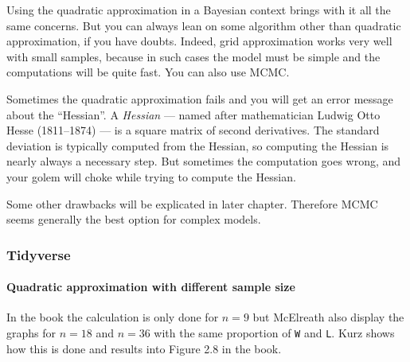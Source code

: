 \documentclass[
  letterpaper,
  DIV=11,
  numbers=noendperiod]{scrreprt}
\let\oldparagraph\paragraph
\renewcommand{\paragraph}[1]{\oldparagraph{#1}\mbox{}}
\begin{document}
Using the quadratic approximation in a Bayesian context brings with it
all the same concerns. But you can always lean on some algorithm other
than quadratic approximation, if you have doubts. Indeed, grid
approximation works very well with small samples, because in such cases
the model must be simple and the computations will be quite fast. You
can also use MCMC.

Sometimes the quadratic approximation fails and you will get an error
message about the ``Hessian''. A \emph{Hessian} --- named after
mathematician Ludwig Otto Hesse (1811--1874) --- is a square matrix of
second derivatives. The standard deviation is typically computed from
the Hessian, so computing the Hessian is nearly always a necessary step.
But sometimes the computation goes wrong, and your golem will choke
while trying to compute the Hessian.

Some other drawbacks will be explicated in later chapter. Therefore MCMC
seems generally the best option for complex models.

\hypertarget{tidyverse-7}{%
\subsubsection{Tidyverse}\label{tidyverse-7}}

\hypertarget{quadratic-approximation-with-different-sample-size}{%
\paragraph{Quadratic approximation with different sample
size}\label{quadratic-approximation-with-different-sample-size}}

In the book the calculation is only done for \(n = 9\) but McElreath
also display the graphs for \(n = 18\) and \(n = 36\) with the same
proportion of \texttt{W} and \texttt{L}. Kurz shows how this is done and
results into Figure 2.8 in the book.
\end{document}
